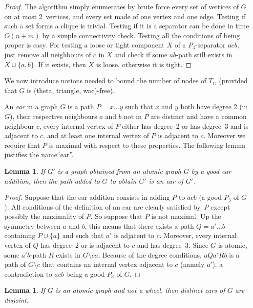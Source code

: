 \documentclass[11pt]{article}
\newtheorem{lemma}[theo]{Lemma}
\newcommand{\sm}{\setminus}
\begin{document}
\begin{proof}
  The algorithm simply enumerates by brute force every set of vertices of $G$ on at most 2~vertices, and every set made of one vertex and one edge. Testing if such a set forms a clique is trivial. Testing if it is a separator can be done in time $O(n+m)$  by a simple connectivity check.  Testing all the conditions of being proper is easy. For testing a loose or tight component $X$ of a $P_3$-separator $acb$, just remove all neighbours of $c$ in $X$ and check if some $ab$-path still exists in $X\cup \{a, b\}$.  If it exists, then $X$ is loose, otherwise it is tight.  
\end{proof}


We now introduce notions needed to bound the number of nodes of $T_G$ (provided that $G$ is (theta, triangle, wac)-free). 


An \emph{ear} in a graph $G$ is a path $P = x\dots y$ such that $x$ and $y$ both have degree $2$ (in $G$), their respective neighbours $a$ and $b$ not in $P$ are distinct and have a common neighbour $c$, every internal vertex of $P$ either has degree~2 or has degree~3 and is adjacent to $c$, and at least one internal vertex of $P$ is adjacent to $c$. Moreover we require that $P$ is maximal with respect to these properties.  The following lemma justifies the name``ear''. 

\begin{lemma}
If $G'$ is a graph obtained from an atomic graph $G$ by a good ear addition, then the  path added to $G$ to obtain $G'$ is an ear of $G'$. 
\end{lemma}

\begin{proof}
  Suppose that the ear addition consists in adding $P$ to $acb$ (a good $P_3$ of $G$).   
  All conditions of the definition of an ear are clearly satisfied by~$P$ except possibly the maximality of $P$.  
  So suppose that $P$ is not maximal. Up the symmetry between $a$ and $b$, this means that there exists a path $Q = a'\dots b$ containing $P\cup\{a\}$ and such that $a'$ is adjacent to $c$. 
  Moreover, every internal vertex of $Q$ has degree~2 or is adjacent to $c$ and has degree~3.  
  Since $G$ is atomic, some $a'b$-path $R$ exists in $G\sm ca$.  
  Because of the degree conditions, $aQa'Rb$ is a path of $G\sm c$ that contains an internal vertex adjacent to $c$ (namely $a'$), a contradiction to $acb$ being a good $P_3$ of $G$.  
\end{proof}


\begin{lemma}
  \label{l:earDisjoint}
  If $G$ is an atomic graph and not a wheel, then distinct ears of $G$ are disjoint. 
\end{lemma}
\end{document}
